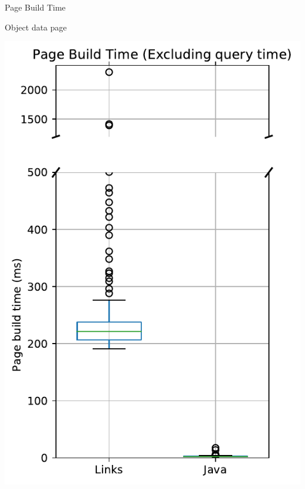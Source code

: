 \documentclass[11.5pt, aspectratio=169]{beamer}
\begin{document}
\begin{frame}{Page Build Time}
\begin{minipage}[t]{0.48\textwidth}
    \vspace{-0.75em}
    \begin{center}
      Object data page
    \end{center}
  \end{minipage}
  \hfill
  \begin{minipage}[t]{0.48\textwidth}
    \centering
    \includegraphics[scale=0.33]{images/diseasedisplay_pagebuild_excl_box.pdf}
    ~

\end{minipage}
\end{frame}
\end{document}
